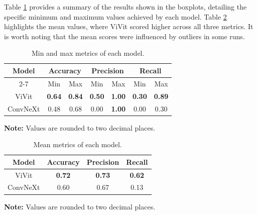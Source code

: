 Table \ref{tab:min_max_metrics} provides a summary of the results shown in the boxplots, detailing the specific minimum and maximum values achieved by each model. Table \ref{tab:mean_metrics} highlights the mean values, where ViVit scored higher across all three metrics. It is worth noting that the mean scores were influenced by outliers in some runs.

\begin{table}[h]
    \centering
    \caption{Min and max metrics of each model.}
    \renewcommand{\arraystretch}{1.5}
    \begin{tabular}{|c|c|c|c|c|c|c|}
        \hline
        \multirow{2}{*}{\textbf{Model}} & \multicolumn{2}{|c|}{\textbf{Accuracy}} & \multicolumn{2}{|c|}{\textbf{Precision}} & \multicolumn{2}{|c|}{\textbf{Recall}} \\ \cline{2-7}
                               & Min  & Max   & Min  & Max   & Min  & Max   \\ \hline
        ViVit                  & \textbf{0.64} & \textbf{0.84}  & \textbf{0.50} & \textbf{1.00}  & \textbf{0.30} & \textbf{0.89}  \\ \hline
        ConvNeXt               & 0.48 & 0.68  & 0.00 & \textbf{1.00} & 0.00 & 0.30  \\ \hline
    \end{tabular}
    \begin{center}
        \parbox{\columnwidth}{\centering \footnotesize \textbf{Note:} Values are rounded to two decimal places.}
    \end{center}
    \label{tab:min_max_metrics}
\end{table}


\begin{table}[h]
    \centering
    \caption{Mean metrics of each model.}
    \renewcommand{\arraystretch}{1.5}
    \begin{tabular}{|c|c|c|c|}
        \hline
        \textbf{Model}     & \textbf{Accuracy}     & \textbf{Precision}     & \textbf{Recall}     \\ \hline
        ViVit     & \textbf{0.72}         & \textbf{0.73}          & \textbf{0.62}       \\ \hline
        ConvNeXt  & 0.60         & 0.67          & 0.13       \\ \hline
    \end{tabular}
    \begin{center}
        \parbox{\columnwidth}{\centering \footnotesize \textbf{Note:} Values are rounded to two decimal places.}
    \end{center}
    \label{tab:mean_metrics}
\end{table}

